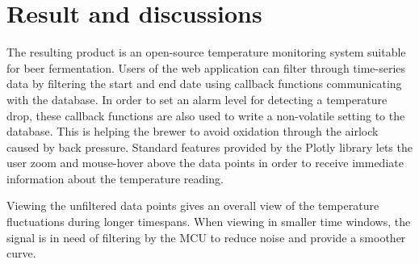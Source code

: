 \section{Result and discussions}%
\label{sec:result_and_discussions}

The resulting product is an open-source temperature monitoring system suitable for beer fermentation. Users of the web application can filter through time-series data by filtering the start and end date using callback functions communicating with the database. In order to set an alarm level for detecting a temperature drop, these callback functions are also used to write a non-volatile setting to the database. This is helping the brewer to avoid oxidation through the airlock caused by back pressure.
Standard features provided by the Plotly library lets the user zoom and mouse-hover above the data points in order to receive immediate information about the temperature reading. 

Viewing the unfiltered data points gives an overall view of the temperature fluctuations during longer timespans. When viewing in smaller time windows, the signal is in need of filtering by the MCU to reduce noise and provide a smoother curve.


